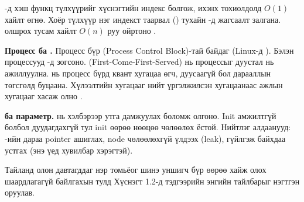 \textbf{}-д хэш функц түлхүүрийг хүснэгтийн индекс болгож, ихэнх тохиолдолд $O(1)$ хайлт өгнө. Хоёр түлхүүр нэг индекст таарвал () тухайн -д жагсаалт залгана.  олшрох тусам хайлт $O(n)$ руу ойртоно .

\textbf{Процесс ба .} Процесс бүр  (Process Control Block)-тай байдаг (Linux-д ). Бэлэн процессууд -д зогсоно.  (First-Come-First-Served) нь процессыг дуустал нь ажиллуулна.  нь процесс бүрд квант хугацаа өгч, дуусаагүй бол дарааллын төгсгөлд буцаана. Хүлээлтийн хугацааг нийт үргэлжилсэн хугацаанаас ажлын хугацааг хасаж олно .

\textbf{ ба параметр.}  нь  хэлбэрээр утга дамжуулах боломж олгоно. Init амжилтгүй болбол  дуудагдахгүй тул init өөрөө нөөцөө чөлөөлөх ёстой. Нийтлэг алдаанууд: -ийн дараа pointer ашиглах, node чөлөөлөхгүй үлдээх (leak), гүйлгэж байхдаа устгах (энэ үед  хувилбар хэрэгтэй).

Тайланд олон давтагддаг нэр томьёог шинэ уншигч бүр өөрөө хайж олох шаардлагагүй байлгахын тулд Хүснэгт 1.2-д тэдгээрийн энгийн тайлбарыг нэгтгэн оруулав.


